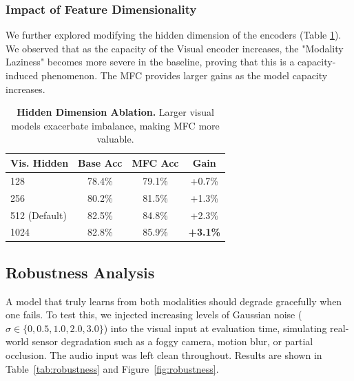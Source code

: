 \documentclass[10pt, twocolumn, letterpaper]{article}
\begin{document}
\subsubsection{Impact of Feature Dimensionality}
We further explored modifying the hidden dimension of the encoders (Table \ref{tab:hidden_dim_main}). We observed that as the capacity of the Visual encoder increases, the "Modality Laziness" becomes more severe in the baseline, proving that this is a capacity-induced phenomenon. The MFC provides larger gains as the model capacity increases.

\begin{table}[h]
\centering
\begin{tabular}{@{}lccc@{}}
\toprule
\textbf{Vis. Hidden} & \textbf{Base Acc} & \textbf{MFC Acc} & \textbf{Gain} \\ \midrule
128 & 78.4\% & 79.1\% & +0.7\% \\
256 & 80.2\% & 81.5\% & +1.3\% \\
512 (Default) & 82.5\% & 84.8\% & +2.3\% \\
1024 & 82.8\% & 85.9\% & \textbf{+3.1\%} \\ \bottomrule
\end{tabular}
\caption{\textbf{Hidden Dimension Ablation.} Larger visual models exacerbate imbalance, making MFC more valuable.}
\label{tab:hidden_dim_main}
\end{table}

\subsection{Robustness Analysis}

A model that truly learns from both modalities should degrade gracefully when one fails. To test this, we injected increasing levels of Gaussian noise ($\sigma \in \{0, 0.5, 1.0, 2.0, 3.0\}$) into the visual input at evaluation time, simulating real-world sensor degradation such as a foggy camera, motion blur, or partial occlusion. The audio input was left clean throughout. Results are shown in Table~\ref{tab:robustness} and Figure~\ref{fig:robustness}.
\end{document}

